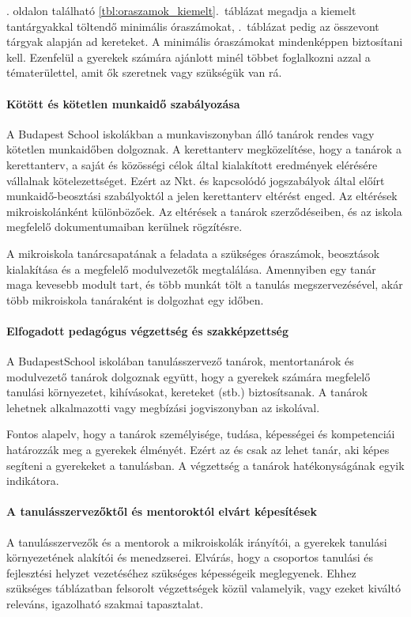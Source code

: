 . oldalon található \ref{tbl:oraszamok_kiemelt}.~táblázat
megadja a kiemelt tantárgyakkal töltendő minimális óraszámokat, .~táblázat pedig az összevont tárgyak alapján ad kereteket. A minimális óraszámokat mindenképpen biztosítani kell. 
Ezenfelül a gyerekek számára ajánlott minél többet foglalkozni azzal a tématerülettel, amit ők szeretnek vagy szükségük van rá.

\paragraph{Kötött és kötetlen munkaidő szabályozása}

A Budapest School iskolákban a munkaviszonyban álló tanárok rendes vagy kötetlen munkaidőben dolgoznak.
A kerettanterv megközelítése, hogy a tanárok a kerettanterv, a saját és közösségi célok által kialakított eredmények elérésére vállalnak kötelezettséget. Ezért az Nkt. és kapcsolódó jogszabályok által előírt munkaidő-beosztási szabályoktól a jelen kerettanterv eltérést enged. Az eltérések mikroiskolánként különbözőek. Az eltérések a tanárok szerződéseiben, és az iskola megfelelő dokumentumaiban kerülnek rögzítésre.

A mikroiskola tanárcsapatának a feladata a szükséges óraszámok, beosztások kialakítása és a megfelelő modulvezetők megtalálása. Amennyiben egy tanár maga kevesebb modult tart, és több munkát tölt a tanulás megszervezésével, akár több mikroiskola tanáraként is dolgozhat egy időben.

\paragraph{Elfogadott pedagógus végzettség és szakképzettség}

A Budapest\break School iskolában tanulásszervező tanárok, mentortanárok és modulvezető tanárok dolgoznak együtt, hogy a gyerekek számára megfelelő tanulási környezetet, kihívásokat, kereteket (stb.) biztosítsanak. A tanárok lehetnek alkalmazotti vagy megbízási jogviszonyban az iskolával.

Fontos alapelv, hogy a tanárok személyisége, tudása, képességei és kompetenciái határozzák meg a gyerekek élményét.  Ezért az és csak az lehet tanár, aki képes segíteni a gyerekeket a tanulásban. A végzettség a tanárok hatékonyságának egyik indikátora.

\paragraph{A tanulásszervezőktől és mentoroktól elvárt képesítések} A
tanulásszervezők és a mentorok a mikroiskolák irányítói, a gyerekek tanulási környezetének alakítói és menedzserei. Elvárás, hogy a csoportos tanulási és fejlesztési helyzet vezetéséhez szükséges képességeik meglegyenek. Ehhez szükséges  táblázatban felsorolt végzettségek közül valamelyik, vagy ezeket kiváltó releváns, igazolható szakmai tapasztalat.

